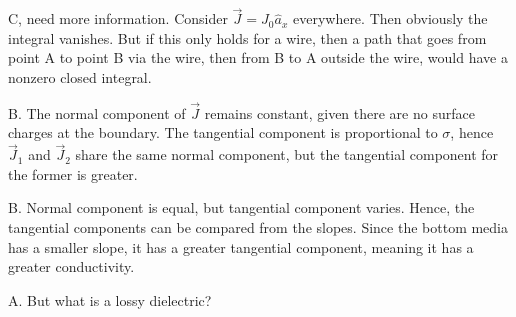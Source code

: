 \documentclass[answers]{exam}
\begin{document}
\begin{questions}

\begin{solution}
	C, need more information. Consider $\vec{J} = J_0\hat{a}_x$ everywhere. Then obviously the integral vanishes. But if this only holds for a wire, then a path that goes from point A to point B via the wire, then from B to A outside the wire, would have a nonzero closed integral.
\end{solution}


\begin{solution}
	B. The normal component of $\vec{J}$ remains constant, given there are no surface charges at the boundary. The tangential component is proportional to $\sigma$, hence $\vec{J}_1$ and $\vec{J}_2$ share the same normal component, but the tangential component for the former is greater.
\end{solution}


\begin{solution}
	B. Normal component is equal, but tangential component varies. Hence, the tangential components can be compared from the slopes. Since the bottom media has a smaller slope, it has a greater tangential component, meaning it has a greater conductivity.
\end{solution}


\begin{solution}
	A. But what is a lossy dielectric?
\end{solution}



\end{questions}
\end{document}

